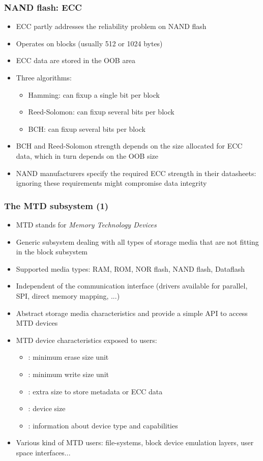 \begin{frame}
  \frametitle{NAND flash: ECC}
  \begin{itemize}
  \item ECC partly addresses the reliability problem on NAND flash
  \item Operates on blocks (usually 512 or 1024 bytes)
  \item ECC data are stored in the OOB area
  \item Three algorithms:
    \begin{itemize}
    \item Hamming: can fixup a single bit per block
    \item Reed-Solomon: can fixup several bits per block
    \item BCH: can fixup several bits per block
    \end{itemize}
  \item BCH and Reed-Solomon strength depends on the size allocated
    for ECC data, which in turn depends on the OOB size
  \item NAND manufacturers specify the required ECC strength in their
    datasheets: ignoring these requirements might compromise data
    integrity
  \end{itemize}
\end{frame}

\begin{frame}
  \frametitle{The MTD subsystem (1)}
  \begin{itemize}
  \item MTD stands for {\em Memory Technology Devices}
  \item Generic subsystem dealing with all types of storage media that
    are not fitting in the block subsystem
  \item Supported media types: RAM, ROM, NOR flash, NAND flash,
    Dataflash
  \item Independent of the communication interface (drivers available
    for parallel, SPI, direct memory mapping, ...)
  \item Abstract storage media characteristics and provide a simple
    API to access MTD devices
  \item MTD device characteristics exposed to users:
    \begin{itemize}
    \item {}: minimum erase size unit
    \item {}: minimum write size unit
    \item {}: extra size to store metadata or ECC data
    \item {}: device size
    \item {}: information about device type and capabilities
    \end{itemize}
  \item Various kind of MTD users: file-systems, block device emulation
    layers, user space interfaces...
  \end{itemize}
\end{frame}

